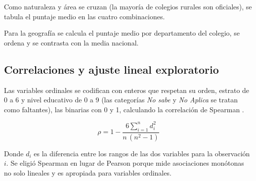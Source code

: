         \vspace{10pt}

        

        \vspace{10pt}

        

        \vspace{10pt}

        Como naturaleza y área se cruzan (la mayoría de colegios rurales son
        oficiales), se tabula el puntaje medio en las cuatro combinaciones.

        \vspace{10pt}

        

        \vspace{10pt}

        Para la geografía se calcula el puntaje medio por departamento del
        colegio, se ordena y se contrasta con la media nacional.

        \vspace{10pt}

        

    \subsection{Correlaciones y ajuste lineal exploratorio}
        Las variables ordinales se codifican con enteros que respetan su orden,
        estrato de 0 a 6 y nivel educativo de 0 a 9 (las categorías \textit{No
        sabe} y \textit{No Aplica} se tratan como faltantes), las binarias con 0 
        y 1, calculando la correlación de Spearman \cite{spearman1904proof}.

        \vspace{10pt}

        \begin{equation}
            \label{spearman}
            \rho = 1 - \frac{6 \sum_{i=1}^{n} d_i^2}{n\,(n^2 - 1)}
        \end{equation}

        \vspace{10pt}
        
        Donde $d_i$ es la diferencia entre los rangos de las dos variables para la
        observación $i$. Se eligió Spearman en lugar de Pearson porque mide
        asociaciones monótonas no solo lineales y es apropiada para variables
        ordinales.

